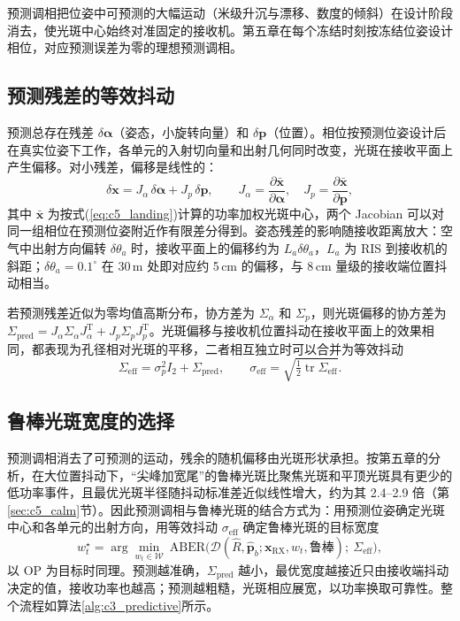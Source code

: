 预测调相把位姿中可预测的大幅运动（米级升沉与漂移、数度的倾斜）在设计阶段消去，使光斑中心始终对准固定的接收机。第五章在每个冻结时刻按冻结位姿设计相位，对应预测误差为零的理想预测调相。

\subsection{预测残差的等效抖动}

预测总存在残差 $\delta\boldsymbol\alpha$（姿态，小旋转向量）和 $\delta\mathbf p$（位置）。相位按预测位姿设计后在真实位姿下工作，各单元的入射切向量和出射几何同时改变，光斑在接收平面上产生偏移。对小残差，偏移是线性的：
\begin{equation}
\delta\mathbf x=J_\alpha\,\delta\boldsymbol\alpha+J_p\,\delta\mathbf p,\qquad
J_\alpha=\frac{\partial\bar{\mathbf x}}{\partial\boldsymbol\alpha},\quad J_p=\frac{\partial\bar{\mathbf x}}{\partial\mathbf p},
\label{eq:c3_pred_shift}
\end{equation}
其中 $\bar{\mathbf x}$ 为按式(\ref{eq:c5_landing})计算的功率加权光斑中心，两个 Jacobian 可以对同一组相位在预测位姿附近作有限差分得到。姿态残差的影响随接收距离放大：空气中出射方向偏转 $\delta\theta_a$ 时，接收平面上的偏移约为 $L_a\delta\theta_a$，$L_a$ 为 RIS 到接收机的斜距；$\delta\theta_a=0.1^\circ$ 在 30\,m 处即对应约 5\,cm 的偏移，与 8\,cm 量级的接收端位置抖动相当。

若预测残差近似为零均值高斯分布，协方差为 $\Sigma_\alpha$ 和 $\Sigma_p$，则光斑偏移的协方差为 $\Sigma_{\mathrm{pred}}=J_\alpha\Sigma_\alpha J_\alpha^{\mathrm T}+J_p\Sigma_pJ_p^{\mathrm T}$。光斑偏移与接收机位置抖动在接收平面上的效果相同，都表现为孔径相对光斑的平移，二者相互独立时可以合并为等效抖动
\begin{equation}
\Sigma_{\mathrm{eff}}=\sigma_p^2I_2+\Sigma_{\mathrm{pred}},\qquad
\sigma_{\mathrm{eff}}=\sqrt{\tfrac12\operatorname{tr}\Sigma_{\mathrm{eff}}}.
\label{eq:c3_eff_jitter}
\end{equation}

\subsection{鲁棒光斑宽度的选择}

预测调相消去了可预测的运动，残余的随机偏移由光斑形状承担。按第五章的分析，在大位置抖动下，“尖峰加宽尾”的鲁棒光斑比聚焦光斑和平顶光斑具有更少的低功率事件，且最优光斑半径随抖动标准差近似线性增大，约为其 2.4--2.9 倍（第\ref{sec:c5_calm}节）。因此预测调相与鲁棒光斑的结合方式为：用预测位姿确定光斑中心和各单元的出射方向，用等效抖动 $\sigma_{\mathrm{eff}}$ 确定鲁棒光斑的目标宽度
\begin{equation}
w_t^\star=\arg\min_{w_t\in\mathcal W}\ \mathrm{ABER}\big(\mathcal D(\hat R,\hat{\mathbf p}_b;\mathbf x_{\mathrm{RX}},w_t,\text{鲁棒});\ \Sigma_{\mathrm{eff}}\big),
\label{eq:c3_width_select}
\end{equation}
以 OP 为目标时同理。预测越准确，$\Sigma_{\mathrm{pred}}$ 越小，最优宽度越接近只由接收端抖动决定的值，接收功率也越高；预测越粗糙，光斑相应展宽，以功率换取可靠性。整个流程如算法\ref{alg:c3_predictive}所示。

